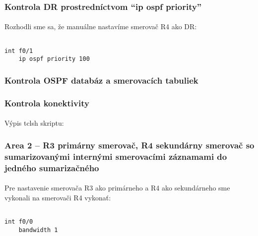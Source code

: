 \documentclass[12pt,twoside,a4paper]{article}
\begin{document}
\subsubsection*{Kontrola DR prostredníctvom  “ip ospf priority”}
\paragraph{}
Rozhodli sme sa, že manuálne nastavíme smerovač R4 ako DR:

\noindent
{\selectfont
\begin{small}
\begin{verbatim}

int f0/1
    ip ospf priority 100

\end{verbatim}
\end{small}
}


\subsubsection*{Kontrola OSPF databáz a smerovacích tabuliek}


\subsubsection*{Kontrola konektivity}
\paragraph{}
Výpis tclsh skriptu:


\subsubsection*{Area 2 – R3 primárny smerovač, R4 sekundárny smerovač so sumarizovanými internými smerovacími záznamami do jedného sumarizačného}
\paragraph{}
Pre nastavenie smerovača R3 ako primárneho a R4 ako sekundárneho sme vykonali na smerovači R4 vykonať:
\noindent
{\selectfont
\begin{small}
\begin{verbatim}

int f0/0
    bandwidth 1

\end{verbatim}
\end{small}
}
\end{document}
